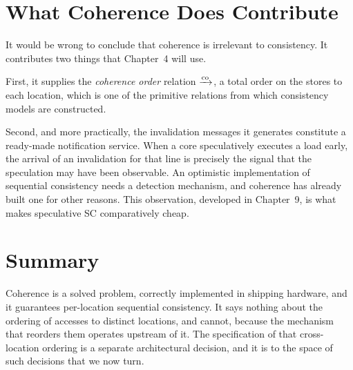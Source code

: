 \section{What Coherence Does Contribute}
\label{sec:coh-contribution}

It would be wrong to conclude that coherence is irrelevant to consistency.
It
contributes two things that Chapter~4 will use.

First, it supplies the \emph{coherence order} relation $\xrightarrow{\text{co}}$, a total order on
the stores to each location, which is one of the primitive relations from which
consistency models are constructed.

Second, and more practically, the invalidation messages it generates constitute a
ready-made notification service.
When a core speculatively executes a load early,
the arrival of an invalidation for that line is precisely the signal that the
speculation may have been observable.
An optimistic implementation of sequential
consistency needs a detection mechanism, and coherence has already built one for
other reasons.
This observation, developed in Chapter~9, is what makes speculative
SC comparatively cheap.

\section{Summary}

Coherence is a solved problem, correctly implemented in shipping hardware, and it
guarantees per-location sequential consistency.
It says nothing about the ordering
of accesses to distinct locations, and cannot, because the mechanism that reorders
them operates upstream of it.
The specification of that cross-location ordering is
a separate architectural decision, and it is to the space of such decisions that
we now turn.
